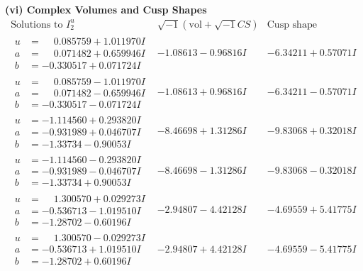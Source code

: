 \documentclass[1p]{elsarticle_modified}
\theoremstyle{definition}
\newcommand{\I}{\sqrt{-1}}
\begin{document}
\newpage\flushleft \textbf{(vi) Complex Volumes and Cusp Shapes}
$$\begin{array}{c|c|c}  
\text{Solutions to }I^u_{2}& \I (\text{vol} + \sqrt{-1}CS) & \text{Cusp shape}\\
 \hline 
\begin{aligned}
u &= \phantom{-}0.085759 + 1.011970 I \\
a &= \phantom{-}0.071482 + 0.659946 I \\
b &= -0.330517 + 0.071724 I\end{aligned}
 & -1.08613 - 0.96816 I & -6.34211 + 0.57071 I \\ \hline\begin{aligned}
u &= \phantom{-}0.085759 - 1.011970 I \\
a &= \phantom{-}0.071482 - 0.659946 I \\
b &= -0.330517 - 0.071724 I\end{aligned}
 & -1.08613 + 0.96816 I & -6.34211 - 0.57071 I \\ \hline\begin{aligned}
u &= -1.114560 + 0.293820 I \\
a &= -0.931989 + 0.046707 I \\
b &= -1.33734 - 0.90053 I\end{aligned}
 & -8.46698 + 1.31286 I & -9.83068 + 0.32018 I \\ \hline\begin{aligned}
u &= -1.114560 - 0.293820 I \\
a &= -0.931989 - 0.046707 I \\
b &= -1.33734 + 0.90053 I\end{aligned}
 & -8.46698 - 1.31286 I & -9.83068 - 0.32018 I \\ \hline\begin{aligned}
u &= \phantom{-}1.300570 + 0.029273 I \\
a &= -0.536713 - 1.019510 I \\
b &= -1.28702 - 0.60196 I\end{aligned}
 & -2.94807 - 4.42128 I & -4.69559 + 5.41775 I \\ \hline\begin{aligned}
u &= \phantom{-}1.300570 - 0.029273 I \\
a &= -0.536713 + 1.019510 I \\
b &= -1.28702 + 0.60196 I\end{aligned}
 & -2.94807 + 4.42128 I & -4.69559 - 5.41775 I \\ \hline\begin{aligned}

\end{aligned}
\end{array}$$
\end{document}
